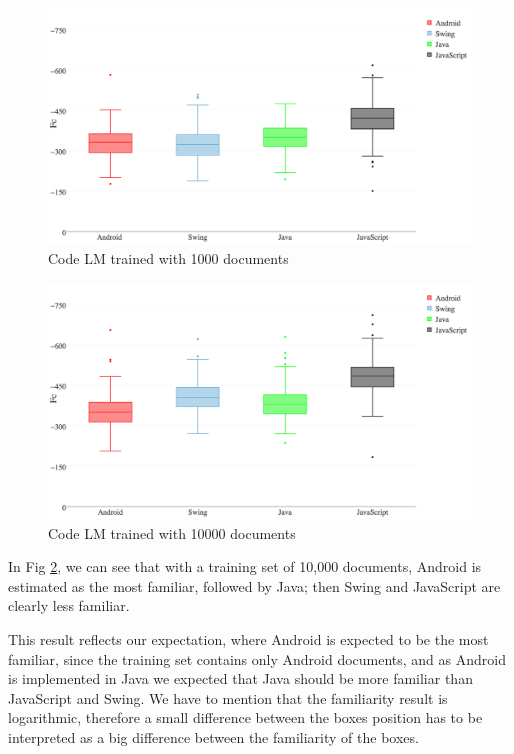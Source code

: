 \documentclass[12pt,mscthesis]{usiinfthesis}
\begin{document}
{\begin{figure}[H]
			\centering
			\includegraphics[width=\textwidth]{code1000}
			\caption{Code LM trained with 1000 documents}
			\label{code1000}
			\end{figure}

 

\begin{figure}[H]
			\centering
			\includegraphics[width=\textwidth]{code10000}
			\caption{Code LM trained with 10000 documents}
			\label{code10000}
			\end{figure}		
In Fig \ref{code10000}, we can see that with a training set of 10,000 documents, Android is estimated as the most familiar, followed by Java; then Swing and JavaScript are clearly less familiar.

This result reflects our expectation, where Android is expected to be the most familiar, since the training set contains only Android documents, and as Android is implemented in Java we expected that Java should be more familiar than JavaScript and Swing. We have to mention that the familiarity result is logarithmic, therefore a small difference between the boxes position has to be interpreted as a big difference between the familiarity of the boxes.  

}
\end{document}
